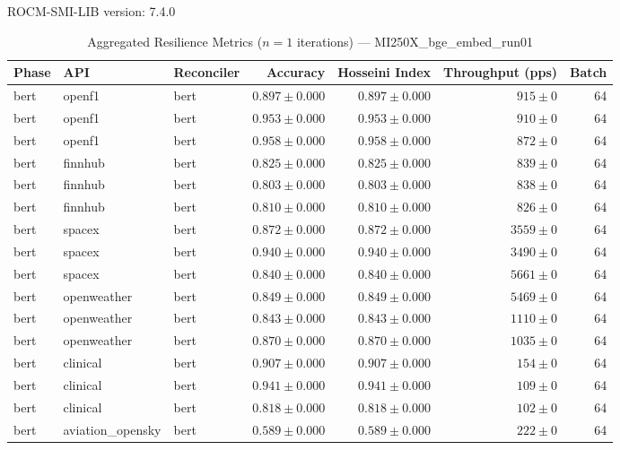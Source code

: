 ROCM-SMI-LIB version: 7.4.0

\begin{table}[htbp]
\caption{Aggregated Resilience Metrics ($n=1$ iterations) --- MI250X_bge_embed_run01}
\begin{tabular}{l l l r r r r}
\hline
Phase & API & Reconciler & Accuracy & Hosseini Index & Throughput (pps) & Batch \\
\hline
bert & openf1 & bert & $0.897\pm0.000$ & $0.897\pm0.000$ & $915\pm0$ & 64 \\
bert & openf1 & bert & $0.953\pm0.000$ & $0.953\pm0.000$ & $910\pm0$ & 64 \\
bert & openf1 & bert & $0.958\pm0.000$ & $0.958\pm0.000$ & $872\pm0$ & 64 \\
bert & finnhub & bert & $0.825\pm0.000$ & $0.825\pm0.000$ & $839\pm0$ & 64 \\
bert & finnhub & bert & $0.803\pm0.000$ & $0.803\pm0.000$ & $838\pm0$ & 64 \\
bert & finnhub & bert & $0.810\pm0.000$ & $0.810\pm0.000$ & $826\pm0$ & 64 \\
bert & spacex & bert & $0.872\pm0.000$ & $0.872\pm0.000$ & $3559\pm0$ & 64 \\
bert & spacex & bert & $0.940\pm0.000$ & $0.940\pm0.000$ & $3490\pm0$ & 64 \\
bert & spacex & bert & $0.840\pm0.000$ & $0.840\pm0.000$ & $5661\pm0$ & 64 \\
bert & openweather & bert & $0.849\pm0.000$ & $0.849\pm0.000$ & $5469\pm0$ & 64 \\
bert & openweather & bert & $0.843\pm0.000$ & $0.843\pm0.000$ & $1110\pm0$ & 64 \\
bert & openweather & bert & $0.870\pm0.000$ & $0.870\pm0.000$ & $1035\pm0$ & 64 \\
bert & clinical & bert & $0.907\pm0.000$ & $0.907\pm0.000$ & $154\pm0$ & 64 \\
bert & clinical & bert & $0.941\pm0.000$ & $0.941\pm0.000$ & $109\pm0$ & 64 \\
bert & clinical & bert & $0.818\pm0.000$ & $0.818\pm0.000$ & $102\pm0$ & 64 \\
bert & aviation\_opensky & bert & $0.589\pm0.000$ & $0.589\pm0.000$ & $222\pm0$ & 64 \\

\end{tabular}
\end{table}

